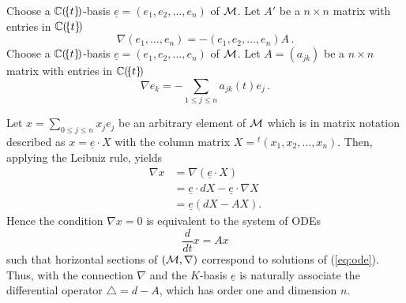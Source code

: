 \begin{multicols}{2}
  Choose a $\mathbb{C}(\!\{t\}\!)$-basis $\underline{e}=(e_1,e_2,\dots,e_n)$ of $\mathcal{M}$.
  Let $A'$ be a $n\times n$ matrix with entries in $\mathbb{C}(\!\{t\}\!)$
  \[
    \nabla\left(e_1,\dots,e_n\right)
    =
    -(e_1,e_2,\dots,e_n)A \,.
  \]
\columnbreak
  Choose a $\mathbb{C}(\!\{t\}\!)$-basis $\underline{e}=(e_1,e_2,\dots,e_n)$ of $\mathcal{M}$.
  Let $A=(a_{jk})$ be a $n\times n$ matrix with entries in $\mathbb{C}(\!\{t\}\!)$
  \[
    \nabla e_k
    =
    -\sum_{1\leq j\leq n} a_{jk}(t)e_j \,.
  \]
\end{multicols}
Let $x=\sum_{0\leq j\leq n}x_je_j$ be an arbitrary element of $\mathcal{M}$ which is in
matrix notation described as $x=\underline{e}\cdot X$ with the column matrix
$X={}^t\!(x_1,x_2 ,\dots,x_n)$.
Then, applying the Leibniz rule, yields
\begin{align*}
  \nabla x&=\nabla\left(\underline{e}\cdot X\right)
  \\&=\underline{e} \cdot dX - \underline{e}\cdot \nabla X
  \\&=\underline{e}\left(dX-AX\right).
\end{align*}
Hence the condition $\nabla x=0$ is equivalent to the system of ODEs
\begin{equation} \label{eq:ode}
  \frac{d}{dt}x=Ax
\end{equation}
such that horizontal sections of $(\mathcal{M},\nabla)$ correspond to solutions of
(\ref{eq:ode}).
Thus, with the connection $\nabla$ and the $K$-basis $\underline{e}$ is
naturally associate the differential operator $\triangle=d-A$, which has order
one and dimension $n$.

